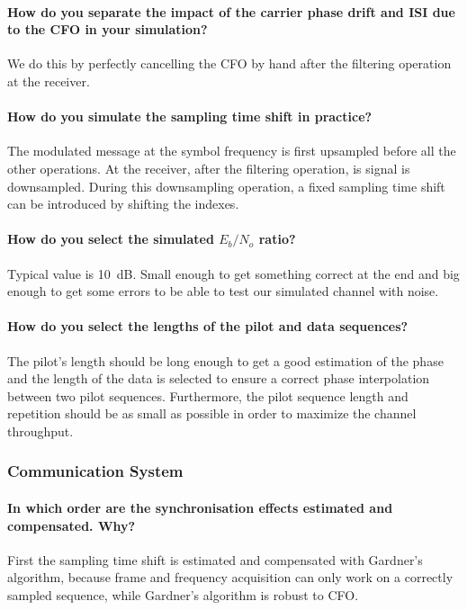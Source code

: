 \paragraph{How do you separate the impact of the carrier phase drift and ISI due to the CFO in your simulation?}
We do this by perfectly cancelling the CFO by hand after the filtering operation at the receiver.

\paragraph{How do you simulate the sampling time shift in practice?}The modulated message at the symbol frequency is first upsampled before all the other operations.
At the receiver, after the filtering operation, is signal is downsampled.
During this downsampling operation, a fixed sampling time shift can be introduced by shifting the indexes.

\paragraph{How do you select the simulated $E_{b}/N_{o}$ ratio?} Typical value is \SI{10}{\deci\bel}. Small enough to get something correct at the end and big enough to get some errors to be able to test our simulated channel with noise.

\paragraph{How do you select the lengths of the pilot and data sequences?} The pilot's length should be long enough to get a good estimation of the phase and the length of the data is selected to ensure a correct phase interpolation between two pilot sequences. Furthermore, the pilot sequence length and repetition should be as small as possible in order to maximize the channel throughput.

\subsubsection{Communication System}


\paragraph{In which order are the synchronisation effects estimated and compensated. Why?} First the sampling time shift is estimated and compensated with Gardner's algorithm, because frame and frequency acquisition can only work on a correctly sampled sequence, while Gardner's algorithm is robust to CFO.


